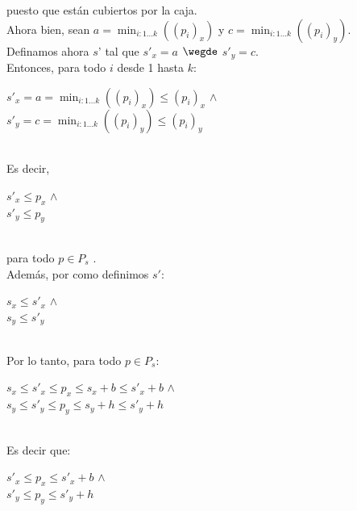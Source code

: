 puesto que est\'an cubiertos por la caja.\\

\indent Ahora bien, sean $a = \min_{i:1...k}((p_{i})_{x})$ y $c = \min_{i:1...k}((p_{i})_{y})$.\\
\indent Definamos ahora $s$' tal que $s'_{x} = a$ $\wegde$ $s'_{y}=c $.\\
\indent Entonces, para todo $i$ desde 1 hasta $k$:\\
\begin{center}
$s'_{x} = a = \min_{i:1...k}((p_{i})_{x}) \leq (p_{i})_{x}$  $\wedge$ \\
$s'_{y} = c = \min_{i:1...k}((p_{i})_{y}) \leq (p_{i})_{y}$  \\
\end{center}\\

\indent Es decir,\\ 

\begin{center}
$s'_{x} \leq p_{x}$  $\wedge$ \\
$s'_{y} \leq p_{y}$  \\
\end{center}\\
 
para todo $p \in P_{s}$ .\\

\indent Adem\'as, por como definimos $s'$:\\
\begin{center}
$s_{x} \leq s'_{x} $  $\wedge$ \\
$s_{y} \leq s'_{y}$\\
\end{center}\\

\indent Por lo tanto, para todo $p \in P_{s}$:\\
\begin{center}
$s_{x} \leq s'_{x} \leq p_{x} \leq s_{x} + b  \leq s'_{x} + b$  $\wedge$ \\
$s_{y} \leq s'_{y} \leq p_{y} \leq s_{y} + h  \leq s'_{y} + h$\\
\end{center}\\

\indent Es decir que:\\
\begin{center}
$s'_{x} \leq p_{x} \leq s'_{x} + b$  $\wedge$ \\
$s'_{y} \leq p_{y} \leq s'_{y} + h$\\
\end{center}\\

